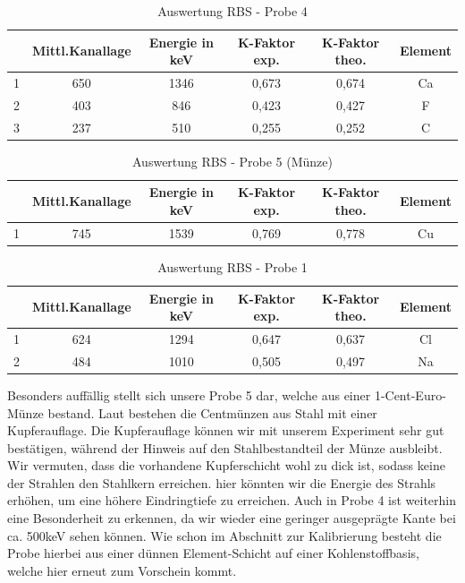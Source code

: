 \begin{table}[h]
	\caption{Auswertung RBS - Probe 4}
	\begin{tabular}{|c|c|c|c|c|c|}
	\hline
	 & Mittl.Kanallage & Energie in keV & K-Faktor exp. & K-Faktor theo. & Element \\ \hline
	   1 & 650 & 1346 & 0,673 & 0,674 & Ca\\ \hline
	   2 & 403 & 846 & 0,423 & 0,427 & F \\ \hline
	   3 & 237 & 510 & 0,255 & 0,252 & C \\ \hline
	\end{tabular}
\label{Probe4}
\end{table}

\begin{table}[h]
	\caption{Auswertung RBS - Probe 5 (Münze)}
	\begin{tabular}{|c|c|c|c|c|c|}
	\hline
	 & Mittl.Kanallage & Energie in keV & K-Faktor exp. & K-Faktor theo. & Element \\ \hline
	   1 & 745 & 1539 & 0,769 & 0,778 & Cu\\ \hline
	\end{tabular}
\label{Probe5}
\end{table}

\begin{table}[h]
	\caption{Auswertung RBS - Probe 1}
	\begin{tabular}{|c|c|c|c|c|c|}
	\hline
	 & Mittl.Kanallage & Energie in keV & K-Faktor exp. & K-Faktor theo. & Element \\ \hline
	   1 & 624 & 1294 & 0,647 & 0,637 & Cl\\ \hline
	   2 & 484 & 1010 & 0,505 & 0,497 & Na \\ \hline
	\end{tabular}
\label{Probe6}
\end{table}

Besonders auffällig stellt sich unsere Probe 5 dar, welche aus einer 1-Cent-Euro-Münze bestand. Laut \cite{muenze} bestehen die Centmünzen aus Stahl mit einer Kupferauflage. Die Kupferauflage können wir mit unserem Experiment sehr gut bestätigen, während der Hinweis auf den Stahlbestandteil der Münze ausbleibt. Wir vermuten, dass die vorhandene Kupferschicht wohl zu dick ist, sodass keine der Strahlen den Stahlkern erreichen. hier könnten wir die Energie des Strahls erhöhen, um eine höhere Eindringtiefe zu erreichen. Auch in Probe 4 ist weiterhin eine Besonderheit zu erkennen, da wir wieder eine geringer ausgeprägte Kante bei ca. 500keV sehen können. Wie schon im Abschnitt zur Kalibrierung besteht die Probe hierbei aus einer dünnen Element-Schicht auf einer Kohlenstoffbasis, welche hier erneut zum Vorschein kommt.



